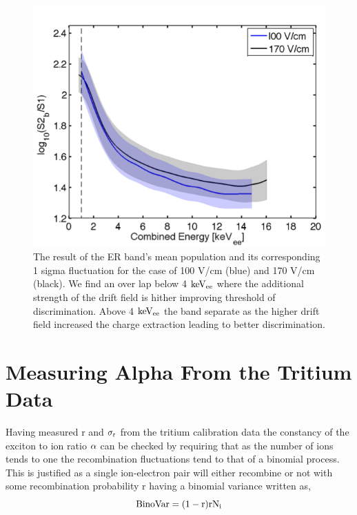 \begin{figure}[h!]\centering
\includegraphics[width=130mm]{Chapter_Flucs/Figures/Iter1_100/Band_comp.png}
\caption{The result of the ER band's mean population and its corresponding 1 sigma fluctuation for the case of 100 V/cm (blue) and 170 V/cm (black). We find an over lap below 4 $\rm keV_{ee}$ where the additional strength of the drift field is hither improving threshold of discrimination. Above 4 $\rm keV_{ee}$ the band separate as the higher drift field increased the charge extraction leading to better discrimination.}
\label{fig:ER_Band_Calc}
\end{figure}

\newpage

\section{Measuring Alpha From the Tritium Data}

Having measured r and $\rm \sigma_r$ from the tritium calibration data the constancy of the exciton to ion ratio $\rm \alpha$ can be checked by requiring that as the number of ions tends to one the recombination fluctuations tend to that of a binomial process. This is justified as a single ion-electron pair will either recombine or not with some recombination probability r having a binomial variance written as,
\begin{equation}
\rm BinoVar= (1-r)rN_i
\label{eq:Bino_Var}
\end{equation}

